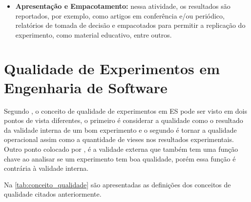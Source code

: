 \begin{itemize}
	\item \textbf{Apresentação e Empacotamento:} nessa atividade, os resultados são reportados, por exemplo, como artigos em conferência e/ou periódico, relatórios de tomada de decisão e empacotados para permitir a replicação do experimento, como material educativo, entre outros.
\end{itemize}

\section{Qualidade de Experimentos em Engenharia de Software}
\label{sec:qual_exp_eng_software}

Segundo \citet{dieste2013challenges}, o conceito de qualidade de experimentos em ES pode ser visto em dois pontos de vista diferentes, o primeiro é considerar a qualidade como o resultado da validade interna de um bom experimento e o segundo é tornar a qualidade operacional assim como a quantidade de vieses nos resultados experimentais. Outro ponto colocado por \citeauthor{dieste2013challenges}, é a validade externa que também tem uma função chave ao analisar se um experimento tem boa qualidade, porém essa função é contrária à validade interna.

Na \ref{tab:conceito_qualidade} são apresentadas as definições dos conceitos de qualidade citados anteriormente.

